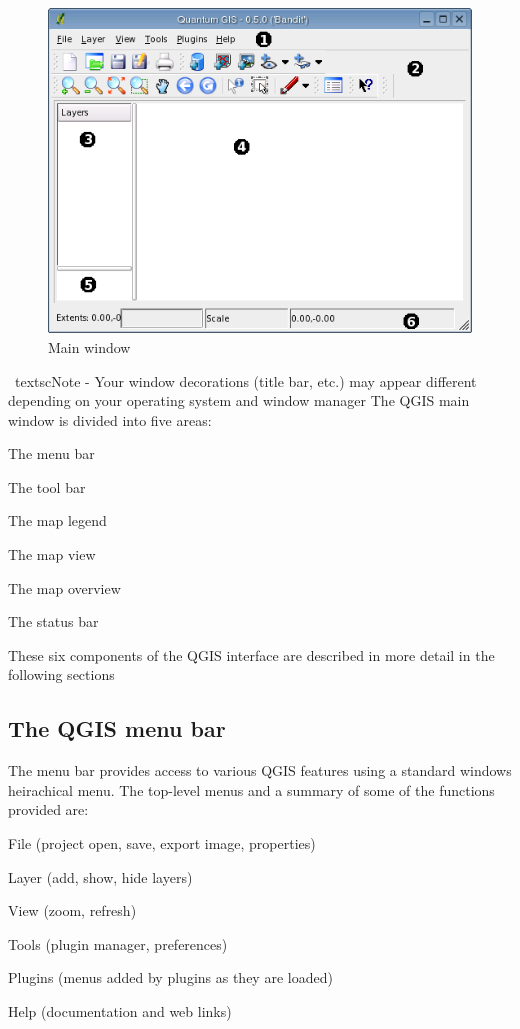 \begin{figure}[h]
   \begin{center}
   \caption{Main window}\label{fig:startup}
   \includegraphics[scale=.9]{qgis_user_guide_images/startup}
\end{center}  
   
\end{figure}
\
textsc{Note - Your window decorations (title bar, etc.) may appear different depending on your operating system and window manager}
The QGIS main window is divided into five areas:
\begin{compactenum}
\item The menu bar
\item The tool bar
\item The map legend
\item The map view
\item The map overview
\item The status bar
\end{compactenum}

These six components of the QGIS interface are described in more detail in the following sections
\subsection{The QGIS menu bar}
The menu bar provides access to various QGIS features using a standard windows
heirachical menu. The top-level menus and a summary of some of the functions provided are:
\begin{compactitem}
\item File (project open, save, export image, properties)
\item Layer (add, show, hide layers)
\item View (zoom, refresh)
\item Tools (plugin manager, preferences)
\item Plugins (menus added by plugins as they are loaded)
\item Help (documentation and web links)
\end{compactitem}

